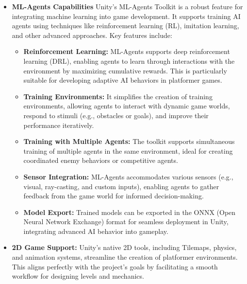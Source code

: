 \documentclass[12pt,oneside,openright,a4paper]{cpe-english-project}
\begin{document}

\begin{itemize}
\item  \textbf{ML-Agents Capabilities}
Unity’s ML-Agents Toolkit is a robust feature for integrating machine learning into game development. It supports training AI agents using techniques like reinforcement learning (RL), imitation learning, and other advanced approaches. Key features include:
\begin{itemize}
\item  \textbf{Reinforcement Learning:} ML-Agents supports deep reinforcement learning (DRL), enabling agents to learn through interactions with the environment by maximizing cumulative rewards. This is particularly suitable for developing adaptive AI behaviors in platformer games.
\item  \textbf{Training Environments:} It simplifies the creation of training environments, allowing agents to interact with dynamic game worlds, respond to stimuli (e.g., obstacles or goals), and improve their performance iteratively.
\item  \textbf{Training with Multiple Agents:} The toolkit supports simultaneous training of multiple agents in the same environment, ideal for creating coordinated enemy behaviors or competitive agents.
\item  \textbf{Sensor Integration:} ML-Agents accommodates various sensors (e.g., visual, ray-casting, and custom inputs), enabling agents to gather feedback from the game world for informed decision-making.
\item  \textbf{Model Export:} Trained models can be exported in the ONNX (Open Neural Network Exchange) format for seamless deployment in Unity, integrating advanced AI behavior into gameplay.
\end{itemize}
\item  \textbf{2D Game Support:}
Unity's native 2D tools, including Tilemaps, physics, and animation systems, streamline the creation of platformer environments. This aligns perfectly with the project's goals by facilitating a smooth workflow for designing levels and mechanics.
\end{itemize}
\end{document}
